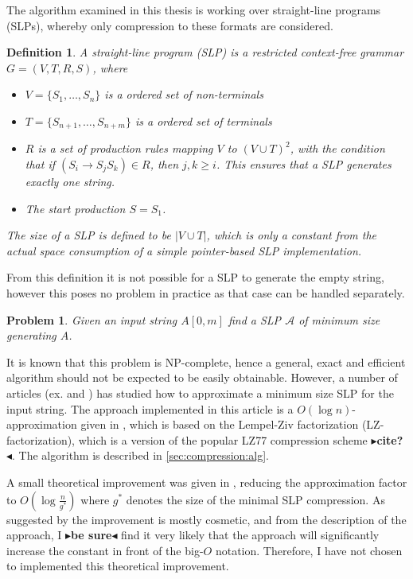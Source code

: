 \documentclass[twoside,11pt,openright]{report}
\newcommand{\todo}[1]{{\color[rgb]{.5,0,0}\textbf{$\blacktriangleright$#1$\blacktriangleleft$}}}
\newcommand{\str}[3]{#1[#2, #3]}
\newcommand{\SLP}[1] {\mathcal{#1}}
\newtheorem{mydef}{Definition}
\newtheorem{problem}{Problem}
\begin{document}
The algorithm examined in this thesis is working over straight-line programs (SLPs), whereby only compression to these formats are considered.
\begin{mydef}
  A straight-line program (SLP) is a restricted context-free grammar $G = (V, T, R, S)$, where
  \begin{itemize}
    \item $V = \{ S_1, \dots, S_n\}$ is a ordered set of non-terminals
    \item $T = \{ S_{n + 1}, \dots, S_{n + m} \}$ is a ordered set of terminals
    \item $R$ is a set of production rules mapping $V$ to $(V \cup T)^2$, with the condition that if $(S_i \to S_jS_k) \in R$, then $j,k \geq i$. This ensures that a SLP generates exactly one string.
    \item The start production $S = S_1$.
  \end{itemize}
  The size of a SLP is defined to be $|V \cup T|$, which is only a constant from the actual space consumption of a simple pointer-based SLP implementation.
\end{mydef}
From this definition it is not possible for a SLP to generate the empty string, however this poses no problem in practice as that case can be handled separately.
\begin{problem}
  \label{compression:problem:minimum-slp}
  Given an input string $\str{A}{0}{m}$ find a SLP $\SLP{A}$ of minimum size generating $A$.
\end{problem}
It is known \cite[p. 212]{Rytter2003211} that this problem is NP-complete, hence a general, exact and efficient algorithm should not be expected to be easily obtainable. However, a number of articles (ex. \cite{Rytter2003211} and \cite{Sakamoto2005416}) has studied how to approximate a minimum size SLP for the input string. The approach implemented in this article is a $O(\log{n})$-approximation given in \cite{Rytter2003211}, which is based on the Lempel-Ziv factorization (LZ-factorization), which is a version of the popular LZ77 compression scheme \todo{cite?}. The algorithm is described in \cref{sec:compression:alg}.

A small theoretical improvement was given in \cite{Rytter2003211}, reducing the approximation factor to $O(\log{\frac{n}{g^*}})$ where $g^*$ denotes the size of the minimal SLP compression. As suggested by \cite{Rytter2003211} the improvement is mostly cosmetic, and from the description of the approach, I \todo{be sure} find it very likely that the approach will significantly increase the constant in front of the big-$O$ notation. Therefore, I have not chosen to implemented this theoretical improvement.
\end{document}
